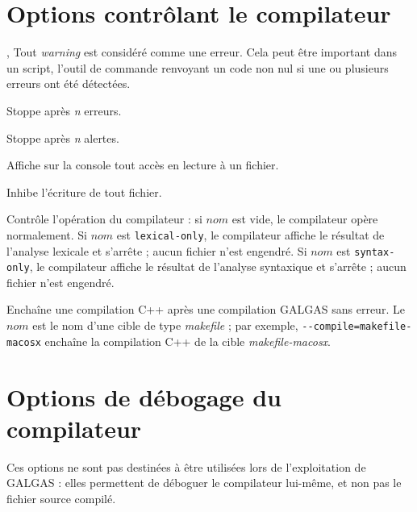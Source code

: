 \section{Options contrôlant le compilateur}





,  Tout \emph{warning} est considéré comme une erreur. Cela peut être important dans un script, l’outil de commande renvoyant un code non nul si une ou plusieurs erreurs ont été détectées.

 Stoppe après \emph{n} erreurs.

 Stoppe après \emph{n} alertes.







 Affiche sur la console tout accès en lecture à un fichier.


 Inhibe l'écriture de tout fichier.


 Contrôle l'opération du compilateur : si $nom$ est vide, le compilateur opère normalement. Si $nom$ est \texttt{lexical-only}, le compilateur affiche le résultat de l'analyse lexicale et s'arrête ; aucun fichier n'est engendré. Si $nom$ est \texttt{syntax-only}, le compilateur affiche le résultat de l'analyse syntaxique et s'arrête ; aucun fichier n'est engendré.





 Enchaîne une compilation C++ après une compilation GALGAS sans erreur. Le $nom$ est le nom d'une cible de type \emph{makefile} ; par exemple, \texttt{-{-}compile=makefile-macosx} enchaîne la compilation C++ de la cible \emph{makefile-macosx}.




\section{Options de débogage du compilateur}

Ces options ne sont pas destinées à être utilisées lors de l'exploitation de GALGAS : elles permettent de déboguer le compilateur lui-même, et non pas le fichier source compilé.



